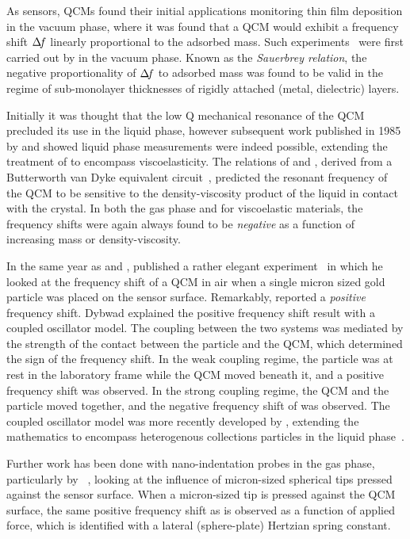 As sensors, QCMs found their initial applications monitoring thin film
deposition in the vacuum phase, where it was found that a QCM would exhibit
a frequency shift $\Delta\!f$ linearly proportional to the adsorbed mass.  Such
experiments~\cite{sauerbrey1959verwendung} were first carried out by
 in the vacuum phase.  Known as the \textit{Sauerbrey
relation}, the negative proportionality of $\Delta\!f$ to adsorbed mass was found
to be valid in the regime of sub-monolayer thicknesses of rigidly attached
(metal, dielectric) layers.

Initially it was thought that the low Q mechanical resonance of the QCM
precluded its use in the liquid phase, however subsequent work published in
1985 by  and  showed liquid phase measurements
were indeed possible, extending the treatment of  to
encompass viscoelasticity.  The relations of  and
, derived from a Butterworth van Dyke equivalent
circuit~\cite{kanazawa1985frequency}, predicted the resonant frequency of
the QCM to be sensitive to the density-viscosity product of the liquid in
contact with the crystal.  In both the gas phase and for viscoelastic
materials, the frequency shifts were again always found to be
\textit{negative} as a function of increasing mass or density-viscosity.

In the same year as  and , 
published a rather elegant experiment~\cite{dybwad1985sensitive} in which
he looked at the frequency shift of a QCM in air when a single micron sized
gold particle was placed on the sensor surface.  Remarkably, 
reported a \textit{positive} frequency shift.  Dybwad explained the
positive frequency shift result with a coupled oscillator model.  The
coupling between the two systems was mediated by the strength of the
contact between the particle and the QCM, which determined the sign of the
frequency shift.  In the weak coupling regime, the particle was at rest in
the laboratory frame while the QCM moved beneath it, and a positive
frequency shift was observed.  In the strong coupling regime, the QCM and
the particle moved together, and the negative frequency shift of
 was observed.  The coupled oscillator model was more
recently developed by , extending the mathematics to
encompass heterogenous collections particles in the liquid
phase~\cite{johannsman2007contacts}.

Further work has been done with nano-indentation probes in the gas phase,
particularly by ~\cite{borovsky2001measuring}, looking at
the influence of micron-sized spherical tips pressed against the sensor
surface.  When a micron-sized tip is pressed against the QCM surface, the
same positive frequency shift as  is observed as a function of
applied force, which is identified with a lateral (sphere-plate) Hertzian
spring constant.

